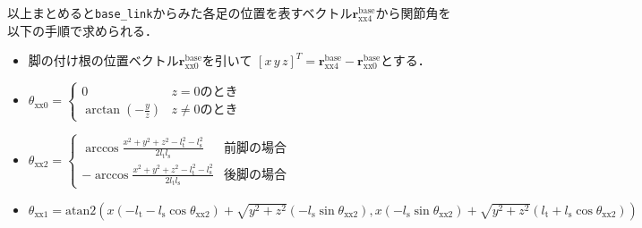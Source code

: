 \documentclass[a4paper]{jlreq}
\begin{document}
  以上まとめると\texttt{base\_link}からみた各足の位置を表すベクトル$\boldsymbol{r}_\mathrm{xx4}^\mathrm{base}$から関節角を以下の手順で求められる．
  \begin{itemize}
    \item 脚の付け根の位置ベクトル$\boldsymbol{r}^\mathrm{base}_\mathrm{xx0}$を引いて
    $[x\, y\, z]^T = \boldsymbol{r}_\mathrm{xx4}^\mathrm{base} - \boldsymbol{r}^\mathrm{base}_\mathrm{xx0}$とする．
    \item $\theta_\mathrm{xx0} = \begin{cases}
      0 & z = 0\text{のとき} \\
      \arctan{\left(-\frac{y}{z}\right)} & z\neq 0\text{のとき}
    \end{cases}$
    \item $\theta_\mathrm{xx2} = \begin{cases}
      \arccos{\frac{x^2 + y^2 + z^2 - l_\mathrm{t}^2 - l_\mathrm{s}^2}{2l_\mathrm{t}l_\mathrm{s}}} & \text{前脚の場合} \\
      -\arccos{\frac{x^2 + y^2 + z^2 - l_\mathrm{t}^2 - l_\mathrm{s}^2}{2l_\mathrm{t}l_\mathrm{s}}} & \text{後脚の場合}
    \end{cases}$
    \item $\theta_\mathrm{xx1} = \mathrm{atan2}\left(
      x\left(-l_\mathrm{t} - l_\mathrm{s}\cos\theta_\mathrm{xx2}\right) + \sqrt{y^2 + z^2}\left(-l_\mathrm{s}\sin\theta_\mathrm{xx2}\right),
      x\left(-l_\mathrm{s}\sin\theta_\mathrm{xx2}\right) + \sqrt{y^2 + z^2}\left(l_\mathrm{t} + l_\mathrm{s}\cos\theta_\mathrm{xx2}\right)
    \right)$
  \end{itemize}
\end{document}
